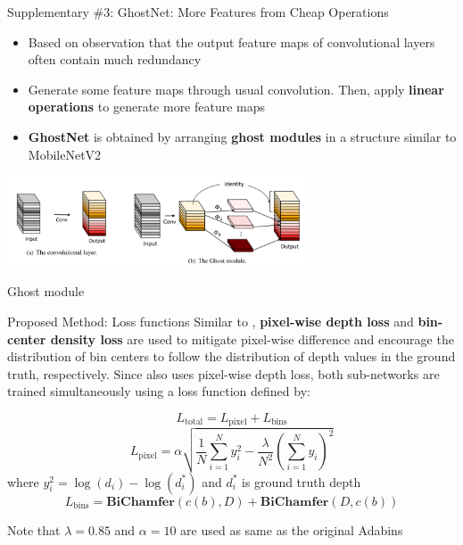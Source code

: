 \documentclass[10pt]{beamer}
\begin{document}
\begin{frame}{Supplementary \#3: GhostNet: More Features from Cheap Operations \cite{ghostnet}}
    \begin{itemize}
        \item Based on observation that the output feature maps of convolutional layers often contain much redundancy
        \item Generate some feature maps through usual convolution. Then, apply \textbf{linear operations} to generate more feature maps
        \item \textbf{GhostNet} is obtained by arranging \textbf{ghost modules} in a structure similar to MobileNetV2
    \end{itemize}
    
    \centering
    \includegraphics[width=9cm]{ghost_module.png}\par
    Ghost module \cite{ghostnet}
\end{frame}

\begin{frame}{Proposed Method: Loss functions}
    Similar to \cite{adabins}, \textbf{pixel-wise depth loss} and \textbf{bin-center density loss} are used to mitigate pixel-wise difference and encourage the distribution of bin centers to follow the distribution of depth values in the ground truth, respectively. Since \cite{bts} also uses pixel-wise depth loss, both sub-networks are trained simultaneously using a loss function defined by:
    
    \vspace{0.1cm} 
    
    $$L_{\text{total}}=L_{\text{pixel}}+L_{\text{bins}}$$
    $$L_{\text{pixel}}=\alpha\sqrt{\frac{1}{N}\sum_{i=1}^{N}y_i^2-\frac{\lambda}{N^2}(\sum_{i=1}^{N}y_i)^2}$$
        where $y_i^{2}=\log(d_i)-\log(d_i^{*})$ and $d_i^{*}$ is ground truth depth
    $$L_{\text{bins}}=\textbf{BiChamfer}(c(b),D)+\textbf{BiChamfer}(D,c(b))$$
    
    \vspace{0.1cm} 
    
    Note that $\lambda=0.85$ and $\alpha=10$ are used as same as the original Adabins \cite{adabins}
    
\end{frame}
\end{document}

